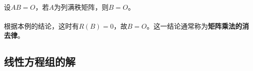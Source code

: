 \paragraph{}
设$AB=O$，若$A$为列满秩矩阵，则$B=O$。

\paragraph{}
根据本例的结论，这时有$R(B)=0$，故$B=O$。这一结论通常称为\textbf{矩阵乘法的消去律}。

\subsection{线性方程组的解}
\paragraph{}
